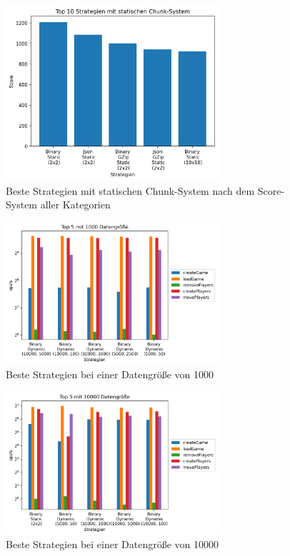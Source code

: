 \begin{figure}[htp]
    \centering
    \includegraphics[width=0.7\textwidth]{images/plots/statisch.png}
    \caption{Beste Strategien mit statischen Chunk-System nach dem Score-System aller Kategorien}
    \label{fig:topStatic}
\end{figure}

\begin{figure}[htp]
    \centering
    \includegraphics[width=0.7\textwidth]{images/plots/1000.png}
    \caption{Beste Strategien bei einer Datengröße von 1000}
    \label{fig:smallDataCount}
\end{figure}

\begin{figure}[htp]
    \centering
    \includegraphics[width=0.7\textwidth]{images/plots/10000.png}
    \caption{Beste Strategien bei einer Datengröße von 10000}
    \label{fig:middleDataCount}
\end{figure}

